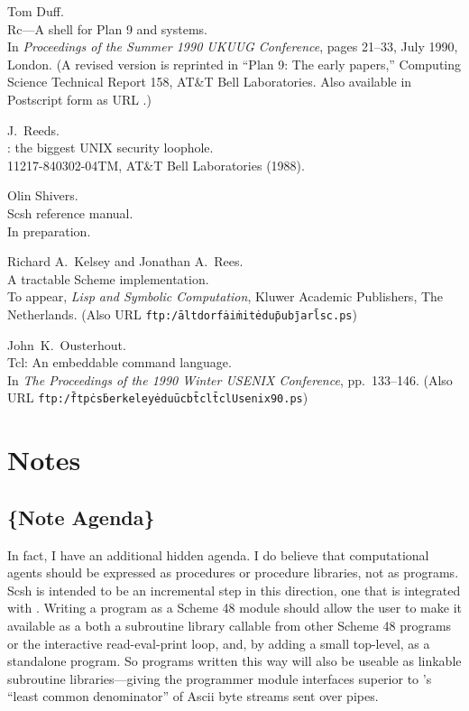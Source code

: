 \begin{thebibliography}{MIT Scheme}
 Tom Duff. \\ Rc---A shell for Plan 9 and {\Unix} systems. \\
	In {\em Proceedings of the Summer 1990 UKUUG Conference},
	pages 21--33, July 1990, London.
	(A revised version is reprinted in ``Plan 9: The early papers,''
	Computing Science Technical Report 158, AT\&T Bell Laboratories.
	Also available in Postscript form as URL
	.)

 J.~Reeds. \\ 
	: the biggest UNIX security loophole. \\
	11217-840302-04TM, AT\&T Bell Laboratories (1988).

 Olin Shivers. \\ Scsh reference manual. \\
	In preparation.

 Richard A.~Kelsey and Jonathan A.~Rees. \\
	A tractable Scheme implementation. \\
	To appear, {\em Lisp and Symbolic Computation},
	Kluwer Academic Publishers, The Netherlands.	
	(Also URL {\tt ftp:/\=altdorf\.ai\.mit\.edu\=pub\=jar\=lsc.ps})

 John~K.~Ousterhout. \\
	Tcl: An embeddable command language. \\
	In {\em The Proceedings of the 1990 Winter USENIX Conference},
	pp.~133--146.
	(Also URL
	{\tt ftp:{\ob}/\=ftp\.cs\.berkeley\.edu\=ucb\=tcl\=tclUsenix90.ps})
\vfill
\end{thebibliography}

\appendix
\cleardoublepage
\section*{Notes}
\newcommand{\notetext}[1]{\subsection*{\{Note #1\}}}

\notetext{Agenda}
In fact, I have an additional hidden agenda.
I do believe that computational agents should be expressed as procedures
or procedure libraries, not as programs.
Scsh is intended to be an incremental step in this direction, one that
is integrated with {\Unix}.
Writing a program as a Scheme 48 module should allow the user to make it
available as a both a subroutine library callable from other Scheme 48
programs or the interactive read-eval-print loop, and, by adding a small
top-level, as a standalone {\Unix} program.
So {\Unix} programs written this way will also be useable as linkable
subroutine libraries---giving the programmer module interfaces superior
to {\Unix}'s ``least common denominator'' of {\sc Ascii} byte streams 
sent over pipes.

